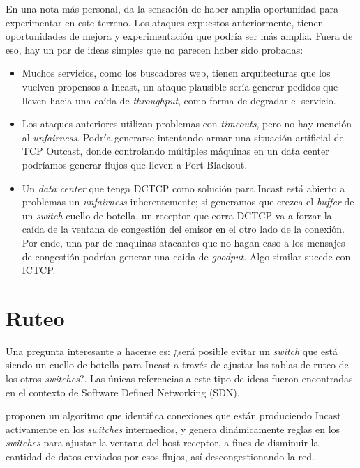 \documentclass[runningheads,a4paper]{llncs}
\begin{document}
En una nota más personal, da la sensación de haber amplia oportunidad para experimentar en este terreno. Los ataques expuestos anteriormente, tienen oportunidades de mejora y experimentación que podría ser más amplia. Fuera de eso, hay un par de ideas simples que no parecen haber sido probadas:

\begin{itemize}
    \item Muchos servicios, como los buscadores web, tienen arquitecturas que los vuelven propensos a Incast, un ataque plausible sería generar pedidos que lleven hacia una caída de \textit{throughput}, como forma de degradar el servicio.
    
    \item Los ataques anteriores utilizan problemas con \textit{timeouts}, pero no hay mención al \textit{unfairness}. Podría generarse intentando armar una situación artificial de TCP Outcast, donde controlando múltiples máquinas en un data center podríamos generar flujos que lleven a Port Blackout.
    
    \item Un \textit{data center} que tenga DCTCP como solución para Incast está abierto a problemas un \textit{unfairness} inherentemente; si generamos que crezca el \textit{buffer} de un \textit{switch} cuello de botella, un receptor que corra DCTCP va a forzar la caída de la ventana de congestión del emisor en el otro lado de la conexión. Por ende, una par de maquinas atacantes que no hagan caso a los mensajes de congestión podrían generar una caida de \textit{goodput}. Algo similar sucede con ICTCP.
\end{itemize}

\newpage

\section{Ruteo}

Una pregunta interesante a hacerse es: ¿será posible evitar un \textit{switch} que está siendo un cuello de botella para Incast a través de ajustar las tablas de ruteo de los otros \textit{switches}?. Las únicas referencias a este tipo de ideas fueron encontradas en el contexto de Software Defined Networking (SDN).

\citet{Yifei_SDNCont_2015} proponen un algoritmo que identifica conexiones que están produciendo Incast activamente en los \textit{switches} intermedios, y genera dinámicamente reglas en los \textit{switches} para ajustar la ventana del host receptor, a fines de  disminuir la cantidad de datos enviados por esos flujos, así descongestionando la red.
\end{document}
